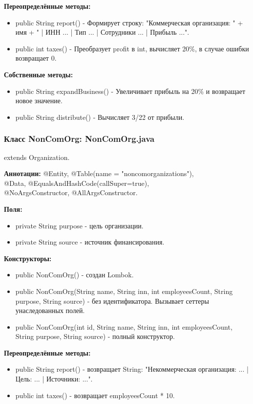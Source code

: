 \documentclass[oneside,a4paper,14pt]{extarticle}
\begin{document}
\textbf{Переопределённые методы:}
\begin{itemize}
    \item public String report() - Формирует строку: "Коммерческая организация: " + имя + " | ИНН ... | Тип ... | Сотрудники ... | Прибыль ...".
    \item public int taxes() - Преобразует profit в int, вычисляет 20\%, в случае ошибки возвращает 0.
\end{itemize}

\newpage

\textbf{Собственные методы:}
\begin{itemize}
    \item public String expandBusiness() - Увеличивает прибыль на 20\% и возвращает новое значение.
    \item public String distribute() - Вычисляет 3/22 от прибыли.
\end{itemize}

\subsubsection*{Класс NonComOrg: NonComOrg.java}

extends Organization.

\textbf{Аннотации:} @Entity, @Table(name = "noncomorganizations"),\\ @Data, @EqualsAndHashCode(callSuper=true),\\ @NoArgsConstructor, @AllArgsConstructor.

\textbf{Поля:}
\begin{itemize}
    \item private String purpose - цель организации.
    \item private String source - источник финансирования.
\end{itemize}

\textbf{Конструкторы:}
\begin{itemize}
    \item public NonComOrg() - создан Lombok.
    \item public NonComOrg(String name, String inn, int employeesCount, String purpose, String source) - без идентификатора. Вызывает сеттеры унаследованных полей.
    \item public NonComOrg(int id, String name, String inn, int employeesCount, String purpose, String source) -  полный конструктор.
\end{itemize}

\textbf{Переопределённые методы:}
\begin{itemize}
    \item public String report() - возвращает String: "Некоммерческая организация: ... | Цель: ... | Источники: ...".
    \item public int taxes() - возвращает employeesCount * 10.
\end{itemize}
\end{document}
